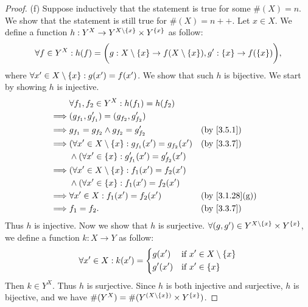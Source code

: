 \begin{proof}{(f)}
  Suppose inductively that the statement is true for some \(\#(X) = n\).
  We show that the statement is still true for \(\#(X) = n++\).
  Let \(x \in X\).
  We define a function \(h : Y^X \to Y^{X \setminus \left\lbrace x\right\rbrace} \times Y^{\left\lbrace x\right\rbrace}\) as follow:
  \[
    \forall f \in Y^X : h(f) = \bigg(g : X \setminus \left\lbrace x\right\rbrace \to f(X \setminus \left\lbrace x\right\rbrace), g' : \left\lbrace x\right\rbrace \to f(\left\lbrace x\right\rbrace)\bigg),
  \]
  where \(\forall x' \in X \setminus \left\lbrace x\right\rbrace : g(x') = f(x')\).
  We show that such \(h\) is bijective.
  We start by showing \(h\) is injective.
  \begin{align*}
             & \forall f_1, f_2 \in Y^X : h(f_1) = h(f_2)                                                        \\
    \implies & (g_{f_1}, g_{f_1}') = (g_{f_2}, g_{f_2}')                                                         \\
    \implies & g_{f_1} = g_{f_2} \land g_{f_2} = g_{f_2}'                      &  & \by{3.5.1}                   \\
    \implies & (\forall x' \in X \setminus \set{x} : g_{f_1}(x') = g_{f_2}(x') &  & \by{3.3.7}                   \\
             & \land (\forall x' \in \set{x} : g_{f_1}'(x') = g_{f_2}'(x')                                       \\
    \implies & (\forall x' \in X \setminus \set{x} : f_1(x') = f_2(x')                                           \\
             & \land (\forall x' \in \set{x} : f_1(x') = f_2(x')                                                 \\
    \implies & \forall x' \in X : f_1(x') = f_2(x')                            &  & \text{(by \cref{3.1.28}(g))} \\
    \implies & f_1 = f_2.                                                      &  & \by{3.3.7}
  \end{align*}
  Thus \(h\) is injective.
  Now we show that \(h\) is surjective.
  \(\forall (g, g') \in Y^{X \setminus \left\lbrace x\right\rbrace} \times Y^{\left\lbrace x\right\rbrace}\), we define a function \(k : X \to Y\) as follow:
  \[
    \forall x' \in X : k(x') = \begin{dcases}
      g(x')  & \text{if } x' \in X \setminus \left\lbrace x\right\rbrace \\
      g'(x') & \text{if } x' \in \left\lbrace x\right\rbrace
    \end{dcases}
  \]
  Then \(k \in Y^X\).
  Thus \(h\) is surjective.
  Since \(h\) is both injective and surjective, \(h\) is bijective, and we have \(\#(Y^X) = \#(Y^{(X \setminus \left\lbrace x\right\rbrace)} \times Y^{\left\lbrace x\right\rbrace})\).

\end{proof}
